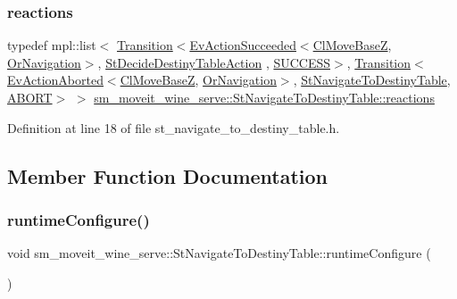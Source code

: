 \subsubsection{\texorpdfstring{reactions}{reactions}}
{\footnotesize\ttfamily typedef mpl\+::list$<$ \hyperlink{classsmacc_1_1Transition}{Transition}$<$\hyperlink{structsmacc_1_1default__events_1_1EvActionSucceeded}{Ev\+Action\+Succeeded}$<$\hyperlink{classcl__move__base__z_1_1ClMoveBaseZ}{Cl\+Move\+BaseZ}, \hyperlink{classsm__moveit__wine__serve_1_1OrNavigation}{Or\+Navigation}$>$, \hyperlink{structsm__moveit__wine__serve_1_1StDecideDestinyTableAction}{St\+Decide\+Destiny\+Table\+Action} , \hyperlink{structsmacc_1_1default__transition__tags_1_1SUCCESS}{S\+U\+C\+C\+E\+SS}$>$, \hyperlink{classsmacc_1_1Transition}{Transition}$<$\hyperlink{structsmacc_1_1default__events_1_1EvActionAborted}{Ev\+Action\+Aborted}$<$\hyperlink{classcl__move__base__z_1_1ClMoveBaseZ}{Cl\+Move\+BaseZ}, \hyperlink{classsm__moveit__wine__serve_1_1OrNavigation}{Or\+Navigation}$>$, \hyperlink{structsm__moveit__wine__serve_1_1StNavigateToDestinyTable}{St\+Navigate\+To\+Destiny\+Table}, \hyperlink{structsmacc_1_1default__transition__tags_1_1ABORT}{A\+B\+O\+RT}$>$ $>$ \hyperlink{structsm__moveit__wine__serve_1_1StNavigateToDestinyTable_a4ce878473a21efd9f22b93a366735f7a}{sm\+\_\+moveit\+\_\+wine\+\_\+serve\+::\+St\+Navigate\+To\+Destiny\+Table\+::reactions}}



Definition at line 18 of file st\+\_\+navigate\+\_\+to\+\_\+destiny\+\_\+table.\+h.



\subsection{Member Function Documentation}
\mbox{\label{structsm__moveit__wine__serve_1_1StNavigateToDestinyTable_a96bf1cd4c69ff8e85fc22286b338b550}} 
\subsubsection{\texorpdfstring{runtime\+Configure()}{runtimeConfigure()}}
{\footnotesize\ttfamily void sm\+\_\+moveit\+\_\+wine\+\_\+serve\+::\+St\+Navigate\+To\+Destiny\+Table\+::runtime\+Configure (\begin{DoxyParamCaption}{ }\end{DoxyParamCaption})\hspace{0.3cm}{\ttfamily [inline]}}



